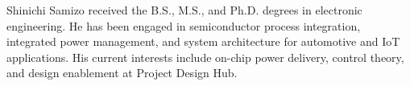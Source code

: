 \documentclass[journal]{IEEEtran}
\begin{document}
\begin{IEEEbiographynophoto}{Shinichi Samizo}
received the B.S., M.S., and Ph.D. degrees in electronic engineering. He has been engaged in semiconductor process integration, integrated power management, and system architecture for automotive and IoT applications. His current interests include on-chip power delivery, control theory, and design enablement at Project Design Hub.
\end{IEEEbiographynophoto}
\end{document}
